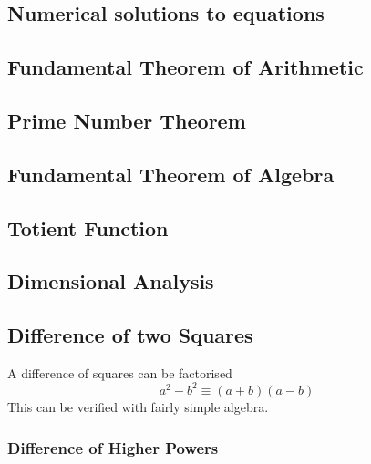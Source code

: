 \documentclass[fleqn,a4paper,11pt]{article}
\begin{document}
    \subsection{Numerical solutions to equations}

    \subsection{Fundamental Theorem of Arithmetic}

    \subsection{Prime Number Theorem}

    \subsection{Fundamental Theorem of Algebra}

    \subsection{Totient Function} \label{sec_totient}

    \subsection{Dimensional Analysis}

    \subsection{Difference of two Squares}

    A difference of squares can be factorised
    \begin{equation}
    a^2 - b^2 \equiv (a + b)(a - b)
    \end{equation}
    This can be verified with fairly simple
    algebra.

    \subsubsection{Difference of Higher Powers}
\end{document}
